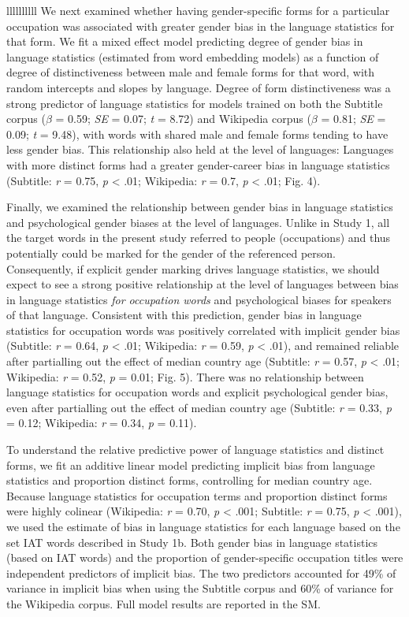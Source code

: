 \documentclass[9pt,twocolumn,twoside,lineno]{pnas-new}
\begin{document}
\begin{table}{llllllllll}
We next examined whether having gender-specific forms for a particular
occupation was associated with greater gender bias in the language
statistics for that form. We fit a mixed effect model predicting degree
of gender bias in language statistics (estimated from word embedding
models) as a function of degree of distinctiveness between male and
female forms for that word, with random intercepts and slopes by
language. Degree of form distinctiveness was a strong predictor of
language statistics for models trained on both the Subtitle corpus
(\(\beta\) = 0.59; \emph{SE} = 0.07; \emph{t} = 8.72) and Wikipedia
corpus (\(\beta\) = 0.81; \emph{SE} = 0.09; \emph{t} = 9.48), with words
with shared male and female forms tending to have less gender bias. This
relationship also held at the level of languages: Languages with more
distinct forms had a greater gender-career bias in language statistics
(Subtitle: \emph{r} = 0.75, \emph{p} \textless{} .01; Wikipedia:
\emph{r} = 0.7, \emph{p} \textless{} .01; Fig. 4).

Finally, we examined the relationship between gender bias in language
statistics and psychological gender biases at the level of languages.
Unlike in Study 1, all the target words in the present study referred to
people (occupations) and thus potentially could be marked for the gender
of the referenced person. Consequently, if explicit gender marking
drives language statistics, we should expect to see a strong positive
relationship at the level of languages between bias in language
statistics \emph{for occupation words} and psychological biases for
speakers of that language. Consistent with this prediction, gender bias
in language statistics for occupation words was positively correlated
with implicit gender bias (Subtitle: \emph{r} = 0.64, \emph{p}
\textless{} .01; Wikipedia: \emph{r} = 0.59, \emph{p} \textless{} .01),
and remained reliable after partialling out the effect of median country
age (Subtitle: \emph{r} = 0.57, \emph{p} \textless{} .01; Wikipedia:
\emph{r} = 0.52, \emph{p} = 0.01; Fig. 5). There was no relationship
between language statistics for occupation words and explicit
psychological gender bias, even after partialling out the effect of
median country age (Subtitle: \emph{r} = 0.33, \emph{p} = 0.12;
Wikipedia: \emph{r} = 0.34, \emph{p} = 0.11).

To understand the relative predictive power of language statistics and
distinct forms, we fit an additive linear model predicting implicit bias
from language statistics and proportion distinct forms, controlling for
median country age. Because language statistics for occupation terms and
proportion distinct forms were highly colinear (Wikipedia: \emph{r} =
0.70, \emph{p} \textless{} .001; Subtitle: \emph{r} = 0.75, \emph{p}
\textless{} .001), we used the estimate of bias in language statistics
for each language based on the set IAT words described in Study 1b. Both
gender bias in language statistics (based on IAT words) and the
proportion of gender-specific occupation titles were independent
predictors of implicit bias. The two predictors accounted for 49\% of
variance in implicit bias when using the Subtitle corpus and 60\% of
variance for the Wikipedia corpus. Full model results are reported in
the SM.


\end{table}
\end{document}
